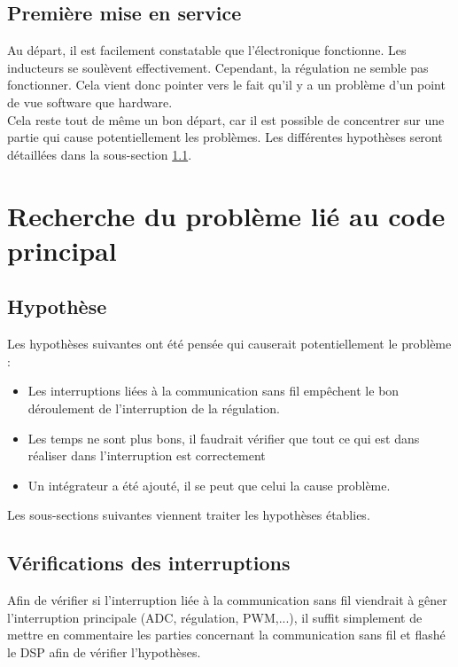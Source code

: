 \subsection{Première mise en service}
Au départ, il est facilement constatable que l'électronique fonctionne. Les inducteurs se soulèvent effectivement. Cependant, la régulation ne semble pas fonctionner. Cela vient donc pointer vers le fait qu'il y a un problème d'un point de vue software que hardware.\\

Cela reste tout de même un bon départ, car il est possible de concentrer sur une partie qui cause potentiellement les problèmes. Les différentes hypothèses seront détaillées dans la sous-section \ref{subsec:Hypothese}.

\section{Recherche du problème lié au code principal}

\subsection{Hypothèse}
\label{subsec:Hypothese}

Les hypothèses suivantes ont été pensée qui causerait potentiellement le problème :

\begin{itemize}
    \item Les interruptions liées à la communication sans fil empêchent le bon déroulement de l'interruption de la régulation.
    \item Les temps ne sont plus bons, il faudrait vérifier que tout ce qui est dans réaliser dans l'interruption est correctement
    \item Un intégrateur a été ajouté, il se peut que celui la cause problème.
\end{itemize}

Les sous-sections suivantes viennent traiter les hypothèses établies.

\subsection{Vérifications des interruptions}

Afin de vérifier si l'interruption liée à la communication sans fil viendrait à gêner l'interruption principale (ADC, régulation, PWM,...), il suffit simplement de mettre en commentaire les parties concernant la communication sans fil et flashé le DSP afin de vérifier l'hypothèses.\\

